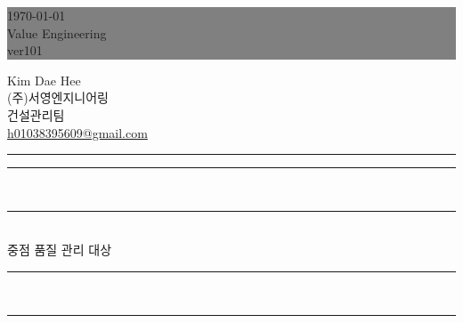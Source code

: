 \documentclass[12pt,a4paper,oneside]{book}
\begin{document}
			\begin{titlepage}
			\thispagestyle{empty}				%
			\colorbox	{grey}
						{ \parbox[t]{1.0\linewidth}
						{
						\vspace*{1.2cm} 
						\fontsize{20}{20} \rmfamily \hfill \today 		\\ [0.8cm] \null
						\fontsize{40}{20} \rmfamily \hfill Value Engineering \\ [0.8cm] \null
						\fontsize{20}{50} \rmfamily \hfill ver101
						\vspace*{0.8cm} 
						} }
			\vfill
			\hfill Kim Dae Hee\\ \null
			\hfill (주)서영엔지니어링\\ \null
			\hfill 건설관리팀\\ \null
			\hfill \url{h01038395609@gmail.com} \\ \null
			\hfill \rule{0.4\linewidth}{1pt}
			\end{titlepage}
			\clearpage


				\newpage   
				\thispagestyle{empty}
				\begin{center}
				\null
				\vspace{6em} %
		
				\rule{\textwidth}{1.6pt}\\[-1.9em]%
				\rule{\textwidth}{0.4pt}\\[2em]
		
				{\Huge 중점 품질 관리 대상 }\\[1.0em]
		
				\rule{\textwidth}{0.4pt}\\[-1.7em]
				\rule{\textwidth}{1.6pt}
				\end{center}



\newpage

			\newenvironment{typing_code}
			{ 	\setlength{\fboxsep}{12pt}
				\begin{boxedminipage}[c]{1.0\linewidth}
				\color{blue}
			}
			{ 	\end{boxedminipage} 
				\color{black}
			}
\end{document}
